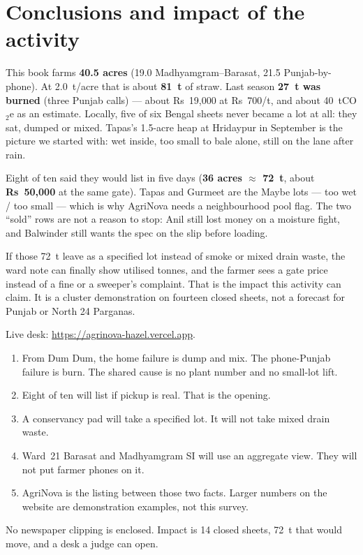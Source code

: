 \documentclass[12pt,a4paper]{article}
\begin{document}
\section{Conclusions and impact of the activity}
This book farms \textbf{40.5 acres} (19.0 Madhyamgram--Barasat, 21.5 Punjab-by-phone). At 2.0~t/acre that is about \textbf{81~t} of straw. Last season \textbf{27~t was burned} (three Punjab calls) --- about Rs~19,000 at Rs~700/t, and about 40~tCO$_2$e as an estimate. Locally, five of six Bengal sheets never became a lot at all: they sat, dumped or mixed. Tapas's 1.5-acre heap at Hridaypur in September is the picture we started with: wet inside, too small to bale alone, still on the lane after rain.

Eight of ten said they would list in five days (\textbf{36 acres $\approx$ 72~t}, about \textbf{Rs~50,000} at the same gate). Tapas and Gurmeet are the Maybe lots --- too wet / too small --- which is why AgriNova needs a neighbourhood pool flag. The two ``sold'' rows are not a reason to stop: Anil still lost money on a moisture fight, and Balwinder still wants the spec on the slip before loading.

If those 72~t leave as a specified lot instead of smoke or mixed drain waste, the ward note can finally show utilised tonnes, and the farmer sees a gate price instead of a fine or a sweeper's complaint. That is the impact this activity can claim. It is a cluster demonstration on fourteen closed sheets, not a forecast for Punjab or North 24 Parganas.

Live desk: \url{https://agrinova-hazel.vercel.app}.

\begin{enumerate}
  \item From Dum Dum, the home failure is dump and mix. The phone-Punjab failure is burn. The shared cause is no plant number and no small-lot lift.
  \item Eight of ten will list if pickup is real. That is the opening.
  \item A conservancy pad will take a specified lot. It will not take mixed drain waste.
  \item Ward~21 Barasat and Madhyamgram SI will use an aggregate view. They will not put farmer phones on it.
  \item AgriNova is the listing between those two facts. Larger numbers on the website are demonstration examples, not this survey.
\end{enumerate}

No newspaper clipping is enclosed. Impact is 14 closed sheets, 72~t that would move, and a desk a judge can open.
\end{document}
